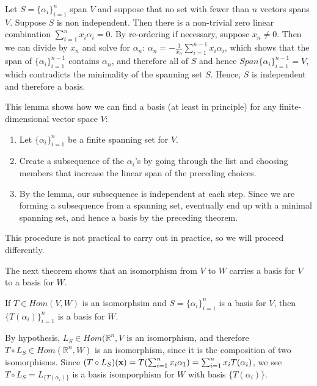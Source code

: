 \documentclass[12pt,letterpaper,reqno]{article}
\numberwithin{equation}{section}
\newcommand{\fixme}[1]{{\color{orange}{[#1]}}}
\begin{document}
\begin{pf}
Let $S=\{\alpha_i\}_{i=1}^n$ span $V$ and suppose that no set with fewer than $n$ vectors spans $V$. Suppose $S$ is non independent. Then there is a non-trivial zero linear combination $\sum_{i=1}^nx_i\alpha_i=0$. By re-ordering if necessary, suppose $x_n \neq 0$. Then we can divide by $x_n$ and solve for $\alpha_n$: $\alpha_n=-\frac{1}{x_n}\sum_{i=1}^{n-1}x_i\alpha_i$, which shows that the span of $\{\alpha_i\}_{i=1}^{n-1}$ contains $\alpha_n$, and therefore all of $S$ and hence $Span\{\alpha_i\}_{i=1}^{n-1}=V$, which contradicts the minimality of the spanning set $S$. Hence, $S$ is independent and therefore a basis.	
\end{pf}

This lemma shows how we can find a basis (at least in principle) for any finite-dimensional vector space $V$:
\begin{enumerate}
	\item Let $\{\alpha_i\}_{i=1}^n$ be a finite spanning set for $V$.
	\item Create a subsequence of the $\alpha_i$'s by going through the list and choosing members that increase the linear span of the preceding choices.
	\item By the lemma, our subsequence is independent at each step. Since we are forming a subsequence from a spanning set, eventually end up with a minimal spanning set, and hence a basis by the preceding theorem. 
\end{enumerate}
This procedure is not practical to carry out in practice, so we will proceed differently. \fixme{Clarify.}

The next theorem shows that an isomorphism from $V$ to $W$ carries a basis for $V$ to a basis for $W$.

\begin{thm}
	If $T \in Hom(V,W)$ is an isomorphsim and $S=\{\alpha_i\}_{i=1}^n$ is a basis for $V$, then $\{T(\alpha_i)\}_{i=1}^n$ is a basis for $W$.	
\end{thm}

\begin{pf}
By hypothesis, $L_S \in Hom(\mathbb{R}^n,V$ is an isomorphism, and therefore $T \circ L_S \in Hom(\mathbb{R}^n,W)$ is an isomorphism, since it is the composition of two isomorphisms. Since $(T \circ L_S)({\bf x})=T(\sum_{i=1}^nx_i\alpha_1)=\sum_{i=1}^nx_iT(\alpha_i)$, we see $T\circ L_S=L_{\{T(\alpha_i)\}}$ is a basis isomporphism for $W$ with basis $\{T(\alpha_i)\}$.	
\end{pf}
\end{document}
